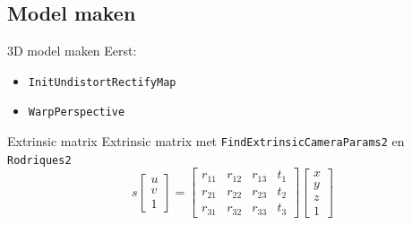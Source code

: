 \documentclass{beamer}
\begin{document}
\subsection{Model maken}
\begin{frame}{3D model maken}
Eerst:
\begin{itemize}
\item \texttt{InitUndistortRectifyMap}
\item \texttt{WarpPerspective}
\end{itemize}
\end{frame}
\begin{frame}{Extrinsic matrix}
{
Extrinsic matrix met \texttt{FindExtrinsicCameraParams2} en \texttt{Rodriques2}
$$
s \left[ \begin{array}{ccc} 
u\\
v\\
1 \end{array} \right] = 
\left[ \begin{array}{cccc} 
r_{11} & r_{12} & r_{13} & t_{1}\\
r_{21} & r_{22} & r_{23} & t_{2}\\
r_{31} & r_{32} & r_{33} & t_{3} \end{array} \right] 
\left[ \begin{array}{ccc} 
x\\
y\\
z\\
1  \end{array} \right] 
$$
}
\end{frame}
\end{document}
